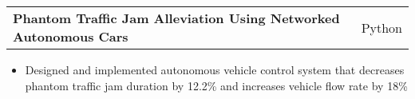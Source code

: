 \documentclass[letterpaper,11pt]{article}
\makeatletter
\newcommand{\resitem}[1]{\item[--] #1}
\newcommand{\ressubheading}[4]{
	\vspace{3pt}
	\begin{tabular*}{7.5in}{l@{\extracolsep{\fill}}r}
			\textbf{#1} & #2 \\
			\textit{#3} & \textit{#4}
	\end{tabular*}
}
\newcommand{\projsubheading}[2]{
	\vspace{3pt}
	\begin{tabular*}{7.5in}{l@{\extracolsep{\fill}}r}
		\textbf{#1} & #2
	\end{tabular*}
}
\makeatother
\begin{document}

\projsubheading{Phantom Traffic Jam Alleviation Using Networked Autonomous Cars}
{Python}
\begin{itemize}
	\resitem{
		Designed and implemented autonomous vehicle control system that
		decreases phantom traffic jam duration by 12.2\% and increases vehicle
		flow rate by 18\%
	}
\end{itemize}


\end{document}
